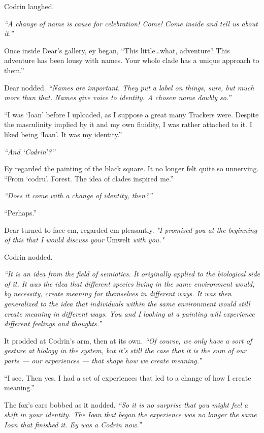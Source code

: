 Codrin laughed.

\emph{``A change of name is cause for celebration! Come! Come inside and tell us about it.''}

Once inside Dear's gallery, ey began, ``This little\ldots{}what, adventure? This adventure has been lousy with names. Your whole clade has a unique approach to them.''

Dear nodded. \emph{``Names are important. They put a label on things, sure, but much more than that. Names give voice to identity. A chosen name doubly so.''}

``I was `Ioan' before I uploaded, as I suppose a great many Trackers were. Despite the masculinity implied by it and my own fluidity, I was rather attached to it. I liked being `Ioan'. It was my identity.''

\emph{``And `Codrin'?''}

Ey regarded the painting of the black square. It no longer felt quite so unnerving. ``From `codru'. Forest. The idea of clades inspired me.''

\emph{``Does it come with a change of identity, then?''}

``Perhaps.''

Dear turned to face em, regarded em pleasantly. \emph{"I promised you at the beginning of this that I would discuss your} Umwelt \emph{with you."}

Codrin nodded.

\emph{``It is an idea from the field of semiotics. It originally applied to the biological side of it. It was the idea that different species living in the same environment would, by necessity, create meaning for themselves in different ways. It was then generalized to the idea that individuals within the same environment would still create meaning in different ways. You and I looking at a painting will experience different feelings and thoughts.''}

It prodded at Codrin's arm, then at its own. \emph{``Of course, we only have a sort of gesture at biology in the system, but it's still the case that it is the sum of our parts — our experiences — that shape how we create meaning.''}

``I see. Then yes, I had a set of experiences that led to a change of how I create meaning.''

The fox's ears bobbed as it nodded. \emph{``So it is no surprise that you might feel a shift in your identity. The Ioan that began the experience was no longer the same Ioan that finished it. Ey was a Codrin now.''}

